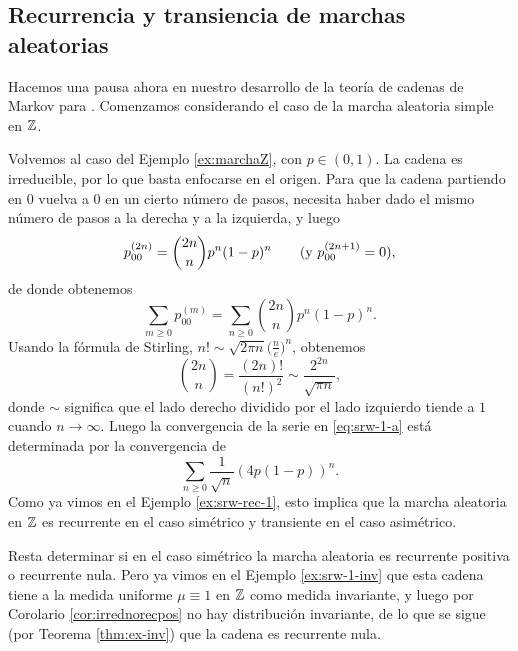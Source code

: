 \subsection{Recurrencia y transiencia de marchas aleatorias}

Hacemos una pausa ahora en nuestro desarrollo de la teoría de cadenas de Markov para .
Comenzamos considerando el caso de la marcha aleatoria simple en $\mathbb{Z}$.

\begin{ex}\label{ex:srw-1-a}
Volvemos al caso del Ejemplo \ref{ex:marchaZ}, con $p\in(0,1)$.
La cadena es irreducible, por lo que basta enfocarse en el origen.
Para que la cadena partiendo en $0$ vuelva a $0$ en un cierto número de pasos, necesita haber dado el mismo número de pasos a la derecha y a la izquierda, y luego
\[p^{(2n)}_{00}={\binom{2n}{n}}p^n(1-p)^n\qquad\text{\upshape{(y }}p^{(2n+1)}_{00}=0\text{\upshape{)}},\]
de donde obtenemos
\begin{equation}
\sum_{m\geq0}p^{(m)}_{00}=\sum_{n\geq0}{\binom{2n}{n}}p^n(1-p)^n.\label{eq:srw-1-a}
\end{equation}
Usando la fórmula de Stirling, $n!\sim\sqrt{2\pi n}\big(\frac{n}{e}\big)^n$, obtenemos 
\[{\binom{2n}{n}}=\frac{(2n)!}{(n!)^2}\sim\frac{2^{2n}}{\sqrt{\pi n}},\]
donde $\sim$ significa que el lado derecho dividido por el lado izquierdo tiende a $1$ cuando $n\to\infty$.
Luego la convergencia de la serie en \eqref{eq:srw-1-a} está determinada por la convergencia de
\[\sum_{n\geq0}\frac{1}{\sqrt{n}}(4p(1-p))^n.\]
Como ya vimos en el Ejemplo \ref{ex:srw-rec-1}, esto implica que la marcha aleatoria en $\mathbb{Z}$ es recurrente en el caso simétrico y transiente en el caso asimétrico.

\noindent Resta determinar si en el caso simétrico la marcha aleatoria es recurrente positiva o recurrente nula.
Pero ya vimos en el Ejemplo \ref{ex:srw-1-inv} que esta cadena tiene a la medida uniforme $\mu\equiv1$ en $\mathbb{Z}$ como medida invariante, y luego por Corolario \ref{cor:irrednorecpos} no hay distribución invariante, de lo que se sigue (por Teorema \ref{thm:ex-inv}) que la cadena es recurrente nula.
\end{ex}

